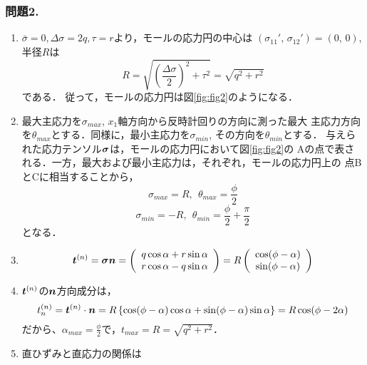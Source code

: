\documentclass[10pt,a4j]{jarticle}
\begin{document}
\subsubsection*{問題2.}
\begin{enumerate}
\item
	$\bar{\sigma}=0, \Delta \sigma=2q, \tau = r$より，モールの応力円の中心は
	$(\sigma_{11}',\, \sigma_{12}')=(0,\, 0)$, 半径$R$は
	\begin{equation}
		R=\sqrt{\left(\frac{\Delta \sigma}{2}\right)^2+\tau ^2}=\sqrt{q^2+r^2}
		\label{neq:Radi}
	\end{equation}
	である．
	従って，モールの応力円は図\ref{fig:fig2}のようになる．
\item
	最大主応力を$\sigma_{max}$, $x_1$軸方向から反時計回りの方向に測った最大
	主応力方向を$\theta_{max}$とする．同様に，最小主応力を$\sigma_{min}$, 
	その方向を$\theta_{min}$とする．
	与えられた応力テンソル$\mbox{\boldmath $\sigma$}$は，モールの応力円において図\ref{fig:fig2}の
	Aの点で表される．一方，最大および最小主応力は，それぞれ，モールの応力円上の
	点BとCに相当することから，
	\begin{equation}
		\sigma_{max}=R, \ \ \theta_{max}=\frac{\phi}{2}
	\end{equation}
	\begin{equation}
		\sigma_{min}=-R, \ \ \theta_{min}=\frac{\phi}{2}+\frac{\pi}{2}
	\end{equation}
	となる．
\item
	\begin{equation}
		\mbox{\boldmath $t$}^{(n)}
		=\mbox{\boldmath $\sigma$}\mbox{\boldmath $n$}
		=
		\left( 
		\begin{array}{c}
			q\cos\alpha + r\sin\alpha \\
			r\cos\alpha - q\sin\alpha 
		\end{array}
		\right)
		=
		R
		\left( 
		\begin{array}{c}
			\cos(\phi-\alpha) \\
			\sin(\phi-\alpha) 
		\end{array}
		\right)
	\end{equation}
\item
	$\mbox{\boldmath $t$}^{(n)}$の$\mbox{\boldmath $n$}$方向成分は，
	\begin{equation}
		t^{(n)}_n=\mbox{\boldmath $t$}^{(n)}\cdot \mbox{\boldmath $n$}
		=
		R\left\{
			\cos(\phi-\alpha)\cos\alpha + \sin(\phi-\alpha) \sin\alpha
		\right\}
		=R\cos(\phi-2\alpha)
	\end{equation}
		だから、$\alpha_{max}=\frac{\phi}{2}$で，$t_{max}=R=\sqrt{q^2+r^2}$．
\item
	直ひずみと直応力の関係は

\end{enumerate}
\end{document}
